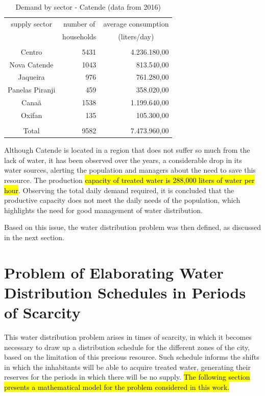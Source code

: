 \documentclass{singlecol}
\theoremstyle{TH}{
\newtheorem{lemma}{Lemma}
\newtheorem{theorem}[lemma]{Theorem}
\newtheorem{corrolary}[lemma]{Corrolary}
\newtheorem{conjecture}[lemma]{Conjecture}
\newtheorem{proposition}[lemma]{Proposition}
\newtheorem{claim}[lemma]{Claim}
\newtheorem{stheorem}[lemma]{Wrong Theorem}
\newtheorem{algorithm}{Algorithm}
}
\theoremstyle{THrm}{
\newtheorem{definition}{Definition}[section]
\newtheorem{question}{Question}[section]
\newtheorem{remark}{Remark}
\newtheorem{scheme}{Scheme}
}
\theoremstyle{THhit}{
\newtheorem{case}{Case}[section]
}
\begin{document}
\begin{table}[H]
\begin{center}
	\begin{tabular}{ c  r  r } 
		supply sector       &  \multicolumn{1}{c}{number of}     &   \multicolumn{1}{c}{average consumption}  \\
		                    &  \multicolumn{1}{c}{households}    &  \multicolumn{1}{c}{(liters/day)}   \\
		\\
		Centro              & 5431          &  4.236.180,00  \\
		Nova Catende        & 1043 			&    813.540,00  \\
		Jaqueira            &  976          &    761.280,00 \\
		Panelas Piranji     &  459          &    358.020,00 \\
		Canaã               & 1538          &  1.199.640,00 \\
		Oxifan              &  135          &    105.300,00 \\
		\\
		Total               & 9582          &  7.473.960,00 \\
		\hline
	\end{tabular}
\caption{Demand by sector - Catende (data from 2016)}
\label{tab:SectorsCatende}
\end{center}
\end{table}

Although Catende is located in a region that does not suffer so much from the lack of water, it has been observed over the years, a considerable drop in its water sources, alerting the population and managers about the need to save this resource. The production \hl{capacity of treated water is 288,000 liters of water per hour}. Observing the total daily demand required, it is concluded that the productive capacity does not meet the daily needs of the population, which highlights the need for good management of water distribution.

Based on this issue, the water distribution problem was then defined, as discussed in the next section. 

\section{Problem of Elaborating Water Distribution Schedules in Periods of Scarcity} 
\label{sec:EWDSPSP}

This water distribution problem arises in times of scarcity, in which it becomes necessary to draw up a distribution schedule for the different zones of the city, based on the limitation of this precious resource. Such schedule informs the shifts in which the inhabitants will be able to acquire treated water, generating their reserves for the periods in which there will be no supply. \hl{The following section presents a mathematical model for the problem considered in this work. }
\end{document}
